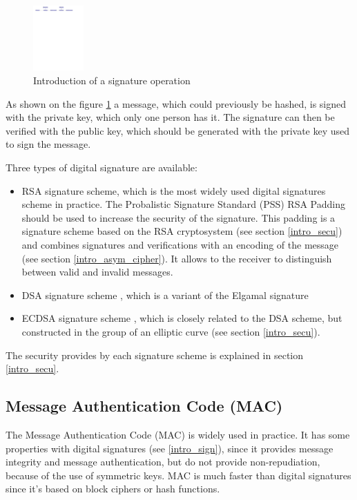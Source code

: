 \begin{figure}[!ht]
\centering
\includegraphics[trim=2cm 25.5cm 5cm 0cm,
height=2.5cm]{figures/intro_signature.pdf}
\caption{Introduction of a signature operation}
\label{fig:sign}
\end{figure}

As shown on the figure \ref{fig:sign} a message, which could previously be
hashed, is signed with the private key, which only one person has it.
The signature can then be verified with the public key, which should be
generated with the private key used to sign the message.

Three types of digital signature are available:
\begin{itemize}
  \item RSA signature scheme, which is the most widely used digital signatures
  scheme in practice.\newline
  The Probalistic Signature Standard (PSS) RSA Padding \cite{RFC3447} should be
  used to increase the security of the signature. This padding is a signature
  scheme based on the RSA cryptosystem (see section \ref{intro_secu}) and
  combines signatures and verifications with an encoding of the message (see
  section \ref{intro_asym_cipher}). It allows to the receiver to distinguish
  between valid and invalid messages.
  \item DSA signature scheme \cite{RFC6979}, which is a variant of the Elgamal
  signature \cite{wiki:elgamal}
  \item ECDSA signature scheme \cite{RFC6979}, which is closely related to the
  DSA scheme, but constructed in the group of an elliptic curve
  (see section \ref{intro_secu}).
\end{itemize}

The security provides by each signature scheme is explained in section
\ref{intro_secu}.

\subsection{Message Authentication Code (MAC)}
\label{intro_mac}

The Message Authentication Code (MAC) is widely used in practice. It has some
properties with digital signatures (see \ref{intro_sign}), since it provides
message integrity and message authentication, but do not provide
non-repudiation, because of the use of symmetric keys.
MAC is much faster than digital signatures since it's based on block ciphers or
hash functions.

